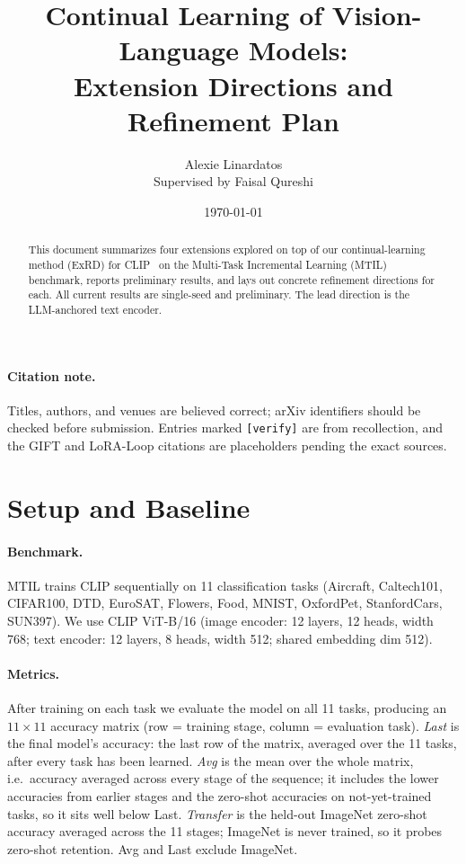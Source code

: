 \documentclass[11pt]{article}
\title{Continual Learning of Vision-Language Models:\\ Extension Directions and Refinement Plan}
\author{Alexie Linardatos \\ \small Supervised by Faisal Qureshi}
\date{\today}
\begin{document}
\maketitle

\begin{abstract}
This document summarizes four extensions explored on top of our continual-learning method (ExRD)
for CLIP~\cite{clip} on the Multi-Task Incremental Learning (MTIL) benchmark, reports preliminary
results, and lays out concrete refinement directions for each. All current results are single-seed
and preliminary. The lead direction is the LLM-anchored text encoder.
\end{abstract}

\paragraph{Citation note.} Titles, authors, and venues are believed correct; arXiv identifiers should
be checked before submission. Entries marked \texttt{[verify]} are from recollection, and the GIFT and
LoRA-Loop citations are placeholders pending the exact sources.

\section{Setup and Baseline}

\paragraph{Benchmark.} MTIL trains CLIP sequentially on 11 classification tasks (Aircraft,
Caltech101, CIFAR100, DTD, EuroSAT, Flowers, Food, MNIST, OxfordPet, StanfordCars, SUN397). We use
CLIP ViT-B/16 (image encoder: 12 layers, 12 heads, width 768; text encoder: 12 layers, 8 heads,
width 512; shared embedding dim 512).

\paragraph{Metrics.} After training on each task we evaluate the model on all 11 tasks, producing an
$11\times11$ accuracy matrix (row = training stage, column = evaluation task). \emph{Last} is the
final model's accuracy: the last row of the matrix, averaged over the 11 tasks, after every task has
been learned. \emph{Avg} is the mean over the whole matrix, i.e.\ accuracy averaged across every
stage of the sequence; it includes the lower accuracies from earlier stages and the zero-shot
accuracies on not-yet-trained tasks, so it sits well below Last. \emph{Transfer} is the held-out
ImageNet zero-shot accuracy averaged across the 11 stages; ImageNet is never trained, so it probes
zero-shot retention. Avg and Last exclude ImageNet.
\end{document}
